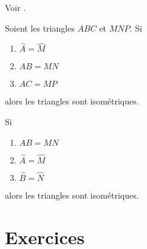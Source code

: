 Voir \cite{TqcjwY}.

\begin{propriete}       \label{PropRtqqxJ}
    Soient les triangles \( ABC\) et \( MNP\). Si
    \begin{enumerate}
        \item
            \( \hat A=\hat M\)
        \item
            \( AB=MN\)
        \item
            \( AC=MP\)
    \end{enumerate}
    alors les triangles sont isométriques.

    Si
    \begin{enumerate}
        \item
            \( AB=MN\)
        \item
            \( \hat A=\hat M\)
        \item
            \( \hat B=\hat N\)
    \end{enumerate}
    alors les triangles sont isométriques.
\end{propriete}

\section{Exercices}

